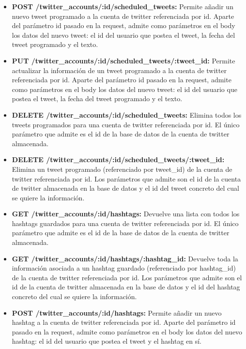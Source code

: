 \documentclass[a4paper]{article}
\begin{document}
\begin{itemize}
		\item \textbf{POST /twitter\_accounts/:id/scheduled\_tweets:} Permite añadir un nuevo tweet programado a la cuenta de twitter referenciada por id. Aparte del parámetro id pasado en la request, admite como parámetros en el body los datos del nuevo tweet: el id del usuario que postea el tweet, la fecha del tweet programado y el texto.
		
		\item \textbf{PUT /twitter\_accounts/:id/scheduled\_tweets/:tweet\_id:} Permite actualizar la información de un tweet programado a la cuenta de twitter referenciada por id. Aparte del parámetro id pasado en la request, admite como parámetros en el body los datos del nuevo tweet: el id del usuario que postea el tweet, la fecha del tweet programado y el texto.
		
		\item \textbf{DELETE /twitter\_accounts/:id/scheduled\_tweets:} Elimina todos los tweets programados para una cuenta de twitter referenciada por id. El único parámetro que admite es el id de la base de datos de la cuenta de twitter almacenada.
		
		\item \textbf{DELETE /twitter\_accounts/:id/scheduled\_tweets/:tweet\_id:} Elimina un tweet programado (referenciado por tweet\_id) de la cuenta de twitter referenciada por id. Los parámetros que admite son el id de la cuenta de twitter almacenada en la base de datos y el id del tweet concreto del cual se quiere la información.
		
		\item \textbf{GET /twitter\_accounts/:id/hashtags:} Devuelve una lista con todos los hashtags guardados para una cuenta de twitter referenciada por id. El único parámetro que admite es el id de la base de datos de la cuenta de twitter almacenada.
		
		\item \textbf{GET /twitter\_accounts/:id/hashtags/:hashtag\_id:} Devuelve toda la información asociada a un hashtag guardado (referenciado por hashtag\_id) de la cuenta de twitter referenciada por id. Los parámetros que admite son el id de la cuenta de twitter almacenada en la base de datos y el id del hashtag concreto del cual se quiere la información.
		\newpage
		\item \textbf{POST /twitter\_accounts/:id/hashtags:} Permite añadir un nuevo hashtag a la cuenta de twitter referenciada por id. Aparte del parámetro id pasado en la request, admite como parámetros en el body los datos del nuevo hashtag: el id del usuario que postea el tweet y el hashtag en sí.
		

\end{itemize}
\end{document}
